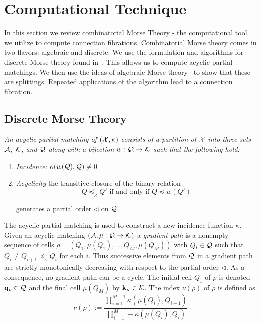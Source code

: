 


\section{Computational Technique}\label{sec:computation}

In this section we review combinatorial Morse Theory - the computational tool we utilize to compute connection fibrations.  Combinatorial Morse theory comes in two flavors: algebraic and discrete.  We use the formulation and algorithms for discrete Morse theory found in~\cite{focm}.  This allows us to compute acyclic partial matchings. We then use the ideas of algebraic Morse theory~\cite{sko} to show that these are splittings.  Repeated applications of the algorithm lead to a connection fibration.

 \subsection{Discrete Morse Theory}

 \begin{defn}
 {\em
 An {\em acyclic partial matching} of $({\mathcal X},\kappa)$ consists of a partition of ${\mathcal X}$ into three sets ${\mathcal A}$, ${\mathcal K}$, and ${\mathcal Q}$ along with a bijection $w:{\mathcal Q}\to {\mathcal K}$ such that the following hold:
 \begin{enumerate}
 \item {\em Incidence:} $\kappa(w({\mathcal Q}),{\mathcal Q})\neq 0$
 
 \item {\em Acyclicity} the transitive closure of the binary relation $$Q \preceq_\kappa Q' \text{ if and only if } Q \preceq w(Q')$$
 
 generates a partial order $\lhd$ on ${\mathcal Q}$.
 \end{enumerate}
 }
 \end{defn} 

The acyclic partial matching is used to construct a new incidence function $\kappa$.  Given an acyclic matching $({\mathcal A},\mu:{\mathcal Q}\to {\mathcal K})$ a {\em gradient path} is a nonempty sequence of cells $\rho = (Q_1,\mu(Q_1),\ldots, Q_M,\mu(Q_M))$ with $Q_i\in {\mathcal Q}$ such that $Q_i\neq Q_{i+1}\preceq_\kappa Q_i$ for each $i$.  Thus successive elements from ${\mathcal Q}$ in a gradient path are strictly monotonically decreasing with respect to the partial order $\lhd$.  As a consequence, no gradient path can be a cycle.  The initial cell $Q_1$ of $\rho$ is denoted ${\bf q}_\rho\in {\mathcal Q}$ and the final cell $\mu(Q_M)$ by ${\bf k}_\rho \in {\mathcal K}$.  The index $\nu(\rho)$ of $\rho$ is defined as $$\nu(\rho):= \frac{\prod_{i=1}^{M-1} \kappa(\mu(Q_i),Q_{i+1})}{\prod_{i=1}^{M} -\kappa(\mu(Q_i),Q_i) }$$

